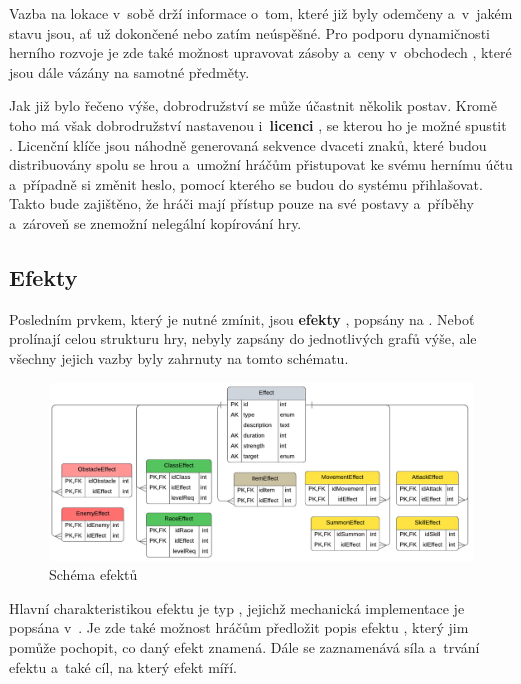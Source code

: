 Vazba na lokace  v~sobě drží informace o~tom, které již byly odemčeny  a~v~jakém stavu  jsou, ať už dokončené nebo zatím neúspěšné. Pro podporu dynamičnosti herního rozvoje je zde také možnost upravovat zásoby a~ceny v~obchodech , které jsou dále vázány na samotné předměty.

Jak již bylo řečeno výše, dobrodružství se může účastnit několik postav. Kromě toho má však dobrodružství nastavenou i~\textbf{licenci} , se kterou ho je možné spustit . Licenční klíče jsou náhodně generovaná sekvence dvaceti znaků, které budou distribuovány spolu se hrou a~umožní hráčům přistupovat ke svému hernímu účtu a~případně si změnit heslo, pomocí kterého se budou do systému přihlašovat. Takto bude zajištěno, že hráči mají přístup pouze na své postavy a~příběhy a~zároveň se znemožní nelegální kopírování hry.


\subsection{Efekty}
\label{subsec:schema_effect}

Posledním prvkem, který je nutné zmínit, jsou \textbf{efekty} , popsány na . Neboť prolínají celou strukturu hry, nebyly zapsány do jednotlivých grafů výše, ale všechny jejich vazby byly zahrnuty na tomto schématu. 

\begin{figure}[h]
    \centering
    \includegraphics[width=\textwidth]{../../shared/diagrams/er_effect.pdf}
    \caption{Schéma efektů}
    \label{diag:er_effect}
\end{figure}

Hlavní charakteristikou efektu je typ , jejichž mechanická implementace je popsána v~. Je zde také možnost hráčům předložit popis efektu , který jim pomůže pochopit, co daný efekt znamená. Dále se zaznamenává síla a~trvání efektu a~také cíl, na který efekt míří.

